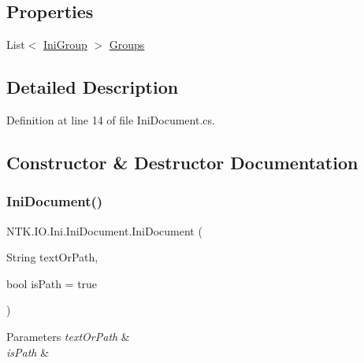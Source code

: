 \subsection*{Properties}
\begin{DoxyCompactItemize}
\item 
List$<$ \mbox{\hyperlink{class_n_t_k_1_1_i_o_1_1_ini_1_1_ini_group}{Ini\+Group}} $>$ \mbox{\hyperlink{class_n_t_k_1_1_i_o_1_1_ini_1_1_ini_document_afa8116b6c65c3036c45ecf8a70e18a75}{Groups}}
\end{DoxyCompactItemize}


\subsection{Detailed Description}




Definition at line 14 of file Ini\+Document.\+cs.



\subsection{Constructor \& Destructor Documentation}
\mbox{\label{class_n_t_k_1_1_i_o_1_1_ini_1_1_ini_document_a755ae2499542a1f128f70ce9aa4cc16b}} 
\subsubsection{\texorpdfstring{IniDocument()}{IniDocument()}}
{\footnotesize\ttfamily N\+T\+K.\+I\+O.\+Ini.\+Ini\+Document.\+Ini\+Document (\begin{DoxyParamCaption}\item[{String}]{text\+Or\+Path,  }\item[{bool}]{is\+Path = {\ttfamily true} }\end{DoxyParamCaption})}






\begin{DoxyParams}{Parameters}
{\em text\+Or\+Path} & \\
\hline
{\em is\+Path} & \\
\hline
\end{DoxyParams}


